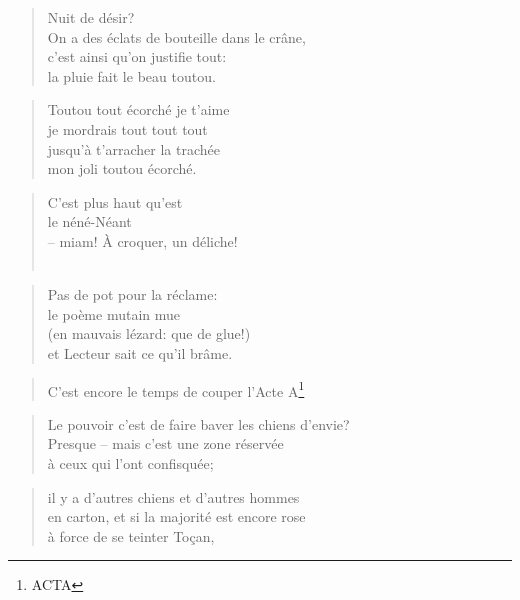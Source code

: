  \begin{verse}
    Nuit de désir?\\
    On a des éclats de bouteille dans le crâne,\\
    c’est ainsi qu’on justifie tout:\\
    la pluie fait le beau toutou.
  \end{verse}
  \begin{verse}
    Toutou tout écorché je t’aime\\
    je mordrais tout tout tout\\
    jusqu’à t’arracher la trachée\\
    mon joli toutou écorché.
  \end{verse}
  \begin{verse}
    C’est plus haut qu’est\\
    le néné-Néant\\
    -- miam! À croquer, un déliche!\\
    \\
  \end{verse}
  \begin{verse}
    Pas de pot pour la réclame:\\
    le poème mutain mue\\
    (en mauvais lézard: que de glue!)\\
    et Lecteur sait ce qu’il brâme.\\
  \end{verse}
  \begin{verse}
    C’est encore le temps de couper l’Acte A\footnote{ACTA}\\
  \end{verse}
  \begin{verse}
    Le pouvoir c’est de faire baver les chiens d’envie?\\
    Presque -- mais c’est une zone réservée\\
    à ceux qui l’ont confisquée;
  \end{verse}
  \begin{verse}
    il y a d’autres chiens et d’autres hommes\\
    en carton, et si la majorité est encore rose\\
    à force de se teinter Toçan,
  \end{verse}
